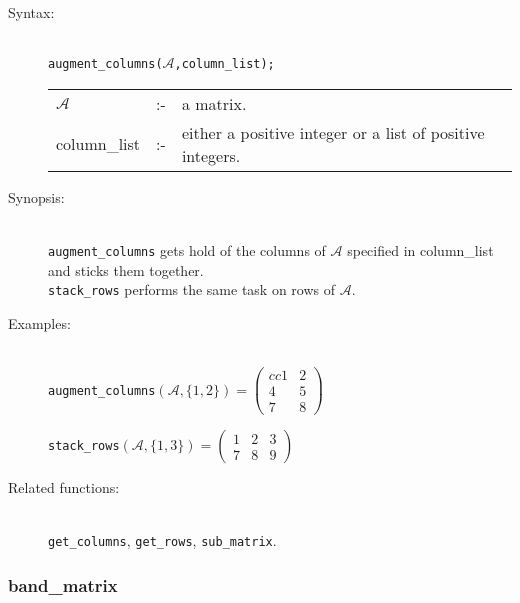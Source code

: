 \begin{description}
\item[Syntax:]\mbox{}\\
 \texttt{augment\_columns($\mathcal{A}$,column\_list);}\\[2mm]
\begin{tabular}{l l l}
$\mathcal{A}$  &:-& a matrix. \\
column\_list &:-&  either a positive integer or a list of positive
                   integers.
\end{tabular}

\item[Synopsis:]\mbox{}\\
\texttt{augment\_columns} gets hold of the columns of $\mathcal{A}$ specified
in column\_list and sticks them together. \\
\texttt{stack\_rows} performs the same task on rows of
                $\mathcal{A}$.

\item[Examples:]\mbox{}\\
  \texttt{augment\_columns}\((\mathcal{A},\{1,2\})  =
  \begin{pmatrix}{cc} 1 & 2 \\ 4 & 5 \\ 7 & 8  \end{pmatrix}\)

  \texttt{stack\_rows}\((\mathcal{A},\{1,3\})  =
  \begin{pmatrix} 1 & 2 & 3 \\ 7 & 8 & 9 \end{pmatrix}\)

\item[Related functions:]\mbox{}\\
\texttt{get\_columns}, \texttt{get\_rows},
\texttt{sub\_matrix}.
\end{description}


\subsubsection{band\_matrix}
\label{linalg:band_matrix}

